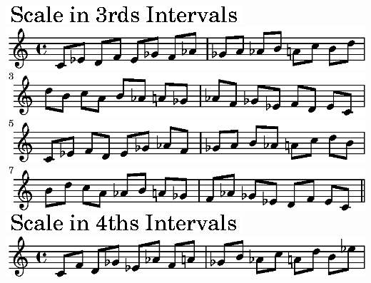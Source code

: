 \ifx\betweenLilyPondSystem \undefined
  \linebreak
\else
  \expandafter{}%
\fi
\includegraphics{7f/lily-6e2c9b00-8}%
\ifx\betweenLilyPondSystem \undefined
  \linebreak
\else
  \expandafter{}%
\fi
\includegraphics{7f/lily-6e2c9b00-9}%
\ifx\betweenLilyPondSystem \undefined
  \linebreak
\else
  \expandafter{}%
\fi
\includegraphics{7f/lily-6e2c9b00-10}%
\ifx\betweenLilyPondSystem \undefined
  \linebreak
\else
  \expandafter{}%
\fi
\includegraphics{7f/lily-6e2c9b00-11}%
\ifx\betweenLilyPondSystem \undefined
  \linebreak
\else
  \expandafter{}%
\fi
\includegraphics{7f/lily-6e2c9b00-12}%
\ifx\betweenLilyPondSystem \undefined
  \linebreak
\else
  \expandafter{}%
\fi
\includegraphics{7f/lily-6e2c9b00-13}%
\ifx\betweenLilyPondSystem \undefined
  \linebreak
\else
  \expandafter{}%
\fi
\includegraphics{7f/lily-6e2c9b00-14}%
